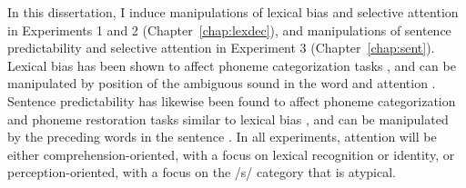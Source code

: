 In this dissertation,  I induce manipulations of lexical bias and selective attention in Experiments 1 and 2 (Chapter~\ref{chap:lexdec}), and manipulations of sentence predictability and selective attention in Experiment 3 (Chapter~\ref{chap:sent}). 
Lexical bias has been shown to affect phoneme categorization tasks \citep{Ganong1980}, and can be manipulated by position of the ambiguous sound in the word and attention \citep{Pitt2012}.  
Sentence predictability has likewise been found to affect phoneme categorization and phoneme restoration tasks similar to lexical bias \citep{Borsky1998, Samuel1981}, and can be manipulated by the preceding words in the sentence \citep{Kalikow1977}.  
In all experiments, attention will be either comprehension-oriented, with a focus on lexical recognition or identity, or perception-oriented, with a focus on the /s/ category that is atypical.
